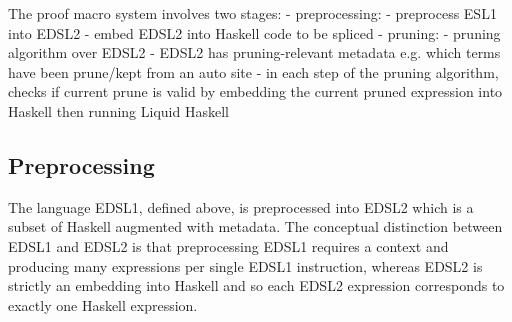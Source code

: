  The proof macro system involves two stages:
 - preprocessing:
   - preprocess ESL1 into EDSL2
   - embed EDSL2 into Haskell code to be spliced
 - pruning:
   - pruning algorithm over EDSL2 
     - EDSL2 has pruning-relevant metadata e.g. which terms have been prune/kept from an auto site
     - in each step of the pruning algorithm, checks if current prune is valid by embedding the current pruned expression into Haskell then running Liquid Haskell
  
\subsection{Preprocessing}
  
%  
%   
 The language EDSL1, defined above, is preprocessed into EDSL2 which is a subset of Haskell augmented with metadata. 
 The conceptual distinction between EDSL1 and EDSL2 is that preprocessing EDSL1 requires a context and producing many expressions per single EDSL1 instruction, whereas EDSL2 is strictly an embedding into Haskell and so each EDSL2 expression corresponds to exactly one Haskell expression.
  
